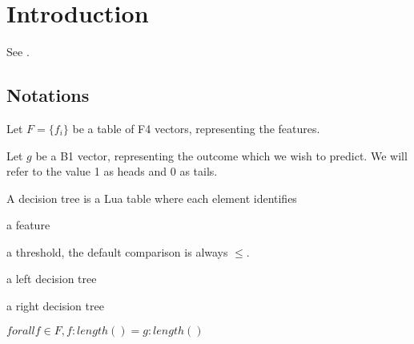 
\section{Introduction}

See \cite{Hastie2009}.

\subsection{Notations}

\bi
\item Let \(F = \{f_i\}\) be a table of F4 vectors, representing the features.
\item Let \(g\) be a B1 vector, representing the outcome which we wish to
predict. We will refer to the value 1 as heads and 0 as tails.
\ei

A decision tree is a Lua table where each element identifies
\be
\item a feature
\item a threshold, the default comparison is always \(\leq\).
\item a left decision tree
\item a right decision tree
\ee

\begin{invariant}
\(forall f \in F, f:length() = g:length()\)
\end{invariant}

